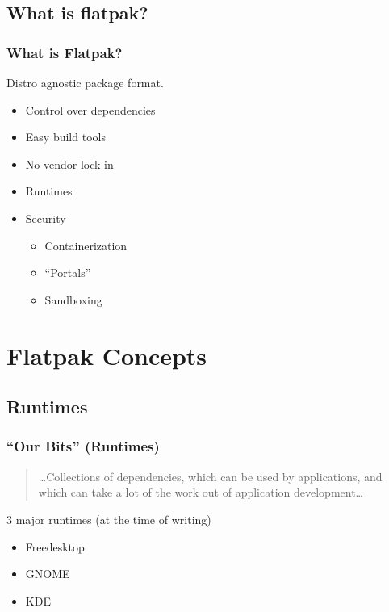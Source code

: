 \documentclass[handout]{beamer}
\begin{document}
\subsection{What is flatpak?} %

\begin{frame}
\frametitle{What is Flatpak?}
	\begin{large}
		Distro agnostic package format.
	\end{large}
\medskip
	\begin{itemize}
		\item{Control over dependencies}
		\item{Easy build tools}
		\item{No vendor lock-in}
		\item{Runtimes}
		\item{Security}
			\begin{itemize}
				\item{Containerization}
				\item{``Portals''}
				\item{Sandboxing}
			\end{itemize}
	\end{itemize}
\end{frame}
\section{Flatpak Concepts}
\subsection{Runtimes}
\begin{frame}
	\frametitle{``Our Bits'' (Runtimes)}
	\begin{quotation}
	\ldots{}Collections of dependencies, which can be used by applications, and which can take a lot of the work out of application development\ldots
	\end{quotation}
	\medskip
	\begin{Large}3 major runtimes (at the time of writing)\end{Large}
	\begin{itemize}
		\item{Freedesktop}
		\item{GNOME}
		\item{KDE}
	\end{itemize}
\end{frame}
\end{document}
